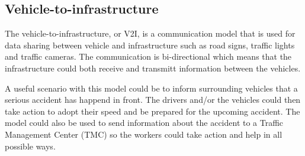 \subsection{Vehicle-to-infrastructure} \label{v2iSec}
The vehicle-to-infrastructure, or V2I, is a communication model that is used for data sharing between vehicle and infrastructure such as road signs, traffic lights and traffic cameras. The communication is bi-directional which means that the infrastructure could both receive and transmitt information between the vehicles. 

\bigskip

A useful scenario with this model could be to inform surrounding vehicles that a serious accident has happend in front. The drivers and/or the vehicles could then take action to adopt their speed and be prepared for the upcoming accident. 
The model could also be used to send information about the accident to a Traffic Management Center (TMC) so the workers could take action and help in all possible ways. \cite{v2xPaper}